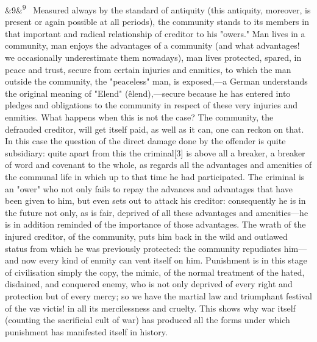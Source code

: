 \documentclass[12pt]{article}
\newcommand{\para}[1][]{\par\noindent\ifx&#1&\else\textsuperscript{\footnotesize #1}~\fi}
\begin{document}
\para[9] Measured always by the standard of antiquity (this antiquity, moreover, is present or again possible at all periods), the community stands to its members in that important and radical relationship of creditor to his "owers." Man lives in a community, man enjoys the advantages of a community (and what advantages! we occasionally underestimate them nowadays), man lives protected, spared, in peace and trust, secure from certain injuries and enmities, to which the man outside the community, the "peaceless" man, is exposed,---a German understands the original meaning of "Elend" (êlend),---secure because he has entered into pledges and obligations to the community in respect of these very injuries and enmities. What happens when this is not the case? The community, the defrauded creditor, will get itself paid, as well as it can, one can reckon on that. In this case the question of the direct damage done by the offender is quite subsidiary: quite apart from this the criminal[3] is above all a breaker, a breaker of word and covenant to the whole, as regards all the advantages and amenities of the communal life in which up to that time he had participated. The criminal is an "ower" who not only fails to repay the advances and advantages that have been given to him, but even sets out to attack his creditor: consequently he is in the future not only, as is fair, deprived of all these advantages and amenities---he is in addition reminded of the importance of those advantages. The wrath of the injured creditor, of the community, puts him back in the wild and outlawed status from which he was previously protected: the community repudiates him---and now every kind of enmity can vent itself on him. Punishment is in this stage of civilisation simply the copy, the mimic, of the normal treatment of the hated, disdained, and conquered enemy, who is not only deprived of every right and protection but of every mercy; so we have the martial law and triumphant festival of the væ victis! in all its mercilessness and cruelty. This shows why war itself (counting the sacrificial cult of war) has produced all the forms under which punishment has manifested itself in history.
\end{document}

